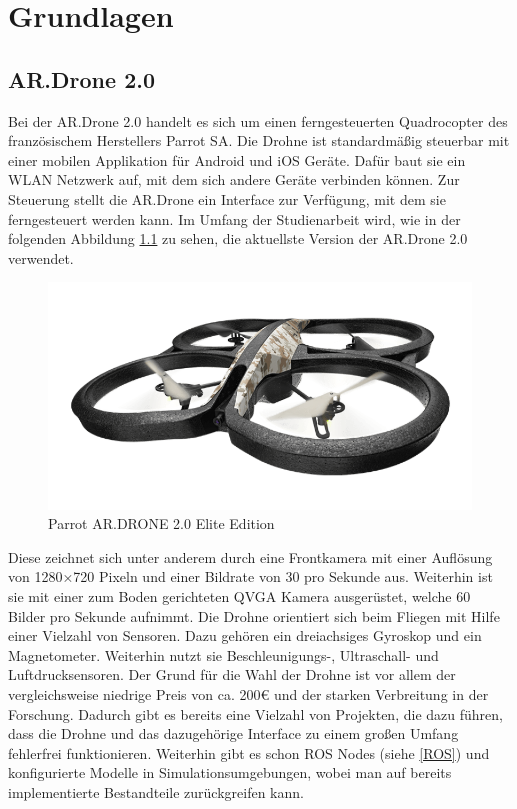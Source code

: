 \chapter{Grundlagen}
\label{cha:Fundamentals}

\section{AR.Drone 2.0}
Bei der AR.Drone 2.0 handelt es sich um einen ferngesteuerten Quadrocopter des französischem Herstellers Parrot SA. \cite{drone} Die Drohne ist standardmäßig steuerbar mit einer mobilen Applikation für Android und iOS Geräte. Dafür baut sie ein WLAN Netzwerk auf, mit dem sich andere Geräte verbinden können. Zur Steuerung stellt die AR.Drone ein Interface zur Verfügung, mit dem sie ferngesteuert werden kann. \newline
Im Umfang der Studienarbeit wird, wie in der folgenden Abbildung \ref{fig:ardrone} zu sehen, die aktuellste Version der AR.Drone 2.0 verwendet. \newline
\begin{figure}[ht]
	\centering
	\includegraphics[scale=0.5]{Bilder/ar_drone.png}
	\caption{Parrot AR.DRONE 2.0 Elite Edition \cite{dronepicture}}
	\label{fig:ardrone}
\end{figure}

Diese zeichnet sich unter anderem durch eine Frontkamera mit einer Auflösung von 1280×720 Pixeln und einer Bildrate von 30 pro Sekunde aus. Weiterhin ist sie mit einer zum Boden gerichteten QVGA Kamera ausgerüstet, welche 60 Bilder pro Sekunde aufnimmt. \newline
Die Drohne orientiert sich beim Fliegen mit Hilfe einer Vielzahl von Sensoren. Dazu gehören ein dreiachsiges Gyroskop und ein Magnetometer. Weiterhin nutzt sie Beschleunigungs-, Ultraschall- und Luftdrucksensoren. \newline
Der Grund für die Wahl der Drohne ist vor allem der vergleichsweise niedrige Preis von ca. 200€ und der starken Verbreitung in der Forschung. Dadurch gibt es bereits eine Vielzahl von Projekten, die dazu führen, dass die Drohne und das dazugehörige Interface zu einem großen Umfang fehlerfrei funktionieren. \newline
Weiterhin gibt es schon ROS Nodes (siehe \ref{ROS}) und konfigurierte Modelle in Simulationsumgebungen, wobei man auf bereits implementierte Bestandteile zurückgreifen kann.


